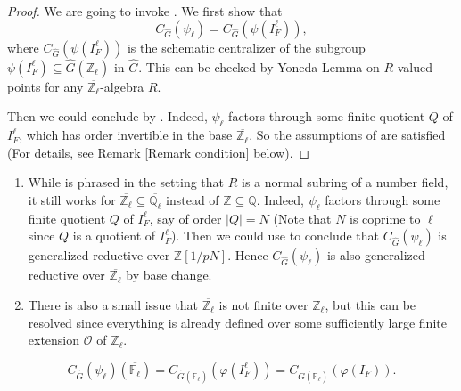 \begin{proof}
	We are going to invoke \cite[Lemma 3.2]{dat2022ihes}. We first show that $$C_{\hat{G}}(\psi_{\ell})=C_{\hat{G}}(\psi(I_F^{\ell})),$$
	where $C_{\hat{G}}(\psi(I_F^{\ell}))$ is the schematic centralizer of the subgroup $\psi(I_F^{\ell}) \subseteq \hat{G}(\overline{\mathbb{Z}_{\ell}})$ in $\hat{G}$. This can be checked by Yoneda Lemma on $R$-valued points for any $\overline{\mathbb{Z}_{\ell}}$-algebra $R$.
	
	Then we could conclude by \cite[Lemma 3.2]{dat2022ihes}. Indeed, $\psi_{\ell}$ factors through some finite quotient $Q$ of $I_F^{\ell}$, which has order invertible in the base $\overline{\mathbb{Z}_{\ell}}$. So the assumptions of \cite[Lemma 3.2]{dat2022ihes} are satisfied (For details, see Remark \ref{Remark condition} below). 
\end{proof}

\begin{remark}\label{Remark condition}
	\begin{enumerate}
		\item While \cite[Lemma 3.2]{dat2022ihes} is phrased in the setting that $R$ is a normal subring of a number field, it still works for $\overline{\mathbb{Z}_{\ell}} \subseteq \overline{\mathbb{Q}_{\ell}}$ instead of $\mathbb{Z} \subseteq \mathbb{Q}$. Indeed, $\psi_{\ell}$ factors through some finite quotient $Q$ of $I_F^{\ell}$, say of order $|Q|=N$ (Note that $N$ is coprime to $\ell$ since $Q$ is a quotient of $I_F^{\ell}$). Then we could use \cite[Lemma 3.2]{dat2022ihes} to conclude that $C_{\hat{G}}(\psi_{\ell})$ is generalized reductive over $\mathbb{Z}[1/pN]$. Hence $C_{\hat{G}}(\psi_{\ell})$ is also generalized reductive over $\overline{\mathbb{Z}_{\ell}}$ by base change.
		\item There is also a small issue that $\overline{\mathbb{Z}_{\ell}}$ is not finite over $\mathbb{Z}_{\ell}$, but this can be resolved since everything is already defined over some sufficiently large finite extension $\mathcal{O}$ of $\mathbb{Z}_{\ell}$.
	\end{enumerate}
\end{remark}

\begin{lemma}\label{Lem I_F^ell}
	$$C_{\hat{G}}(\psi_{\ell})(\overline{\mathbb{F}_{\ell}})=C_{\hat{G}(\overline{\mathbb{F}_{\ell}})}(\varphi(I_F^\ell))=C_{\hat{G}(\overline{\mathbb{F}_{\ell}})}(\varphi(I_F)).$$
\end{lemma}

